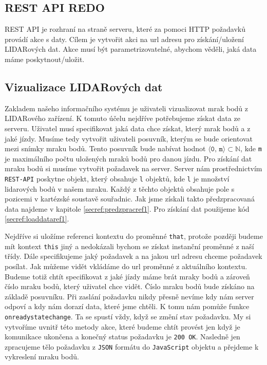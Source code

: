 \documentclass[czech,bachelor,dept420,male,cpdeclaration]{diploma}
\begin{document}
\subsection{REST API REDO}
REST API je rozhraní na straně serveru, které za pomoci HTTP požadavků provádí akce s daty. Cílem je vytvořit akci na url adresu pro získání/uložení LIDARových dat. Akce musí být parametrizovatelné, abychom věděli, jaká data máme poskytnout/uložit.



\subsection{Vizualizace LIDARových dat}  
Zakladem našeho informačního systému je uživateli vizualizovat mrak bodů z LIDARového zařízení. K tomuto účelu nejdříve potřebujeme získat data ze serveru. Uživatel musí specifikovat jaká data chce získat, který mrak bodů a z jaké jízdy. Musíme tedy vytvořit uživateli posuvník, kterým se bude orientovat mezi snímky mraku bodů. Tento posuvník bude nabívat hodnot 
$\langle \texttt{0, m}\rangle \subset \mathbb{N}$, kde \texttt{m} je maximálního počtu uložených mraků bodů pro danou jízdu. Pro získání dat mraku bodů si musíme vytvořit požadavek na server. Server nám prostřednictvím \texttt{REST-API} poskytne objekt, který obsahuje \texttt{l} objektů, kde \texttt{l} je množství lidarových bodů v našem mraku. Každý z těchto objektů obsahuje pole s pozicemi v kartézské soustavě souřadnic. Jak jsme získali takto předzpracovaná data najdeme v kapitole \ref{secref:predzpracref1}. Pro získání dat použijeme kód \ref{secref:loaddataref1}.



Nejdříve si uložíme referenci kontextu do proměnné \texttt{that}, protože později budeme mít kontext \texttt{this} jiný a nedokázali bychom se získat instanční proměnné z naší třídy. Dále specifikujeme jaký požadavek a na jakou url adresu chceme požadavek posílat. Jak můžeme vidět vkládáme do url proměnné z aktuálního kontextu. Budeme totiž chtít specifikovat z jaké jízdy máme brát mraky bodů a zároveň číslo mraku bodů, který uživatel chce vidět. Číslo mraku bodů bude získáno na základě posuvníku. Při zaslání požadavku nikdy přesně nevíme kdy nám server odpoví a kdy nám dorazí data, které jsme chtěli. K tomu nám pomůže funkce \texttt{onreadystatechange}. Ta se spustí vždy, když se změní stav požadavku. My si vytvoříme uvnitř této metody akce, které budeme chtít provést jen když je komunikace ukončena a konečný status požadavku je \texttt{200 OK}. Nasledně jen zpracujeme tělo požadavku z \texttt{JSON} formátu do \texttt{JavaScript} objektu a přejdeme k vykreslení mraku bodů.
\end{document}
